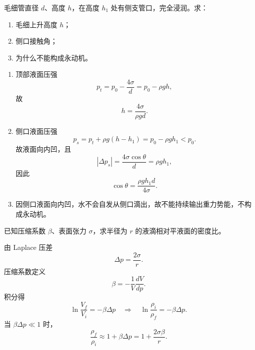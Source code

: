 \begin{question}
毛细管直径 $d$、高度 $h$，在高度 $h_1$ 处有侧支管口，完全浸润。求：
\begin{enumerate}[label=（\arabic*）,leftmargin=2.8em,itemsep=0.2em]
\item 毛细上升高度 $h$；
\item 侧口接触角；
\item 为什么不能构成永动机。
\end{enumerate}
\begin{solution}
\begin{enumerate}[label=（\arabic*）,leftmargin=2.8em,itemsep=0.2em]
\item 顶部液面压强
\[
p_t=p_0-\frac{4\sigma}{d}=p_0-\rho gh,
\]
故
\[
h=\frac{4\sigma}{\rho gd}.
\]
\item 侧口液面压强
\[
p_s=p_t+\rho g(h-h_1)=p_0-\rho gh_1<p_0.
\]
故液面向内凹，且
\[
\left|\Delta p_s\right|=\frac{4\sigma\cos\theta}{d}=\rho gh_1,
\]
因此
\[
\cos\theta=\frac{\rho gh_1d}{4\sigma}.
\]
\item 因侧口液面向内凹，水不会自发从侧口滴出，故不能持续输出重力势能，不构成永动机。
\end{enumerate}
\end{solution}
\end{question}

\begin{question}
已知压缩系数 $\beta$、表面张力 $\sigma$，求半径为 $r$ 的液滴相对平液面的密度比。
\begin{solution}
由 Laplace 压差
\[
\Delta p=\frac{2\sigma}{r}.
\]
压缩系数定义
\[
\beta=-\frac1V\frac{dV}{dp}.
\]
积分得
\[
\ln\frac{V_f}{V_i}=-\beta\Delta p
\quad\Rightarrow\quad
\ln\frac{\rho_i}{\rho_f}=-\beta\Delta p.
\]
当 $\beta\Delta p\ll1$ 时，
\[
\frac{\rho_f}{\rho_i}\approx 1+\beta\Delta p
=1+\frac{2\sigma\beta}{r}.
\]
\end{solution}
\end{question}


